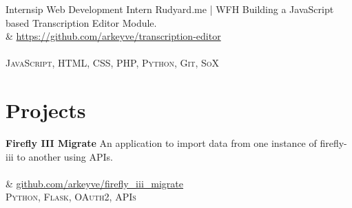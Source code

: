 \documentclass[10pt]{article} %
\begin{document}
\begin{paracol}{2}


{Internsip} %
{Web Development Intern} %
{Rudyard.me | WFH} %
{
Building a JavaScript based Transcription Editor Module.\\
\raisebox{-1pt}{\faGithub} & \href{https://github.com/arkeyve/transcription-editor}{https://github.com/arkeyve/transcription-editor} \\
\\
\textbf{\faCode} \textsc{JavaScript, HTML, CSS, PHP, Python, Git, SoX}
}  %


\vspace{-\baselineskip}\medskip %



\section{Projects}

{} %
{} %
{\textbf{Firefly III Migrate}} %
{
An application to import data from one instance of firefly-iii to another using APIs.\\
\\
\raisebox{-1pt}{\faGithub} & \href{https://github.com/arkeyve/firefly_iii_migrate}{github.com/arkeyve/firefly\_iii\_migrate}\\
\textbf{\faCode} \textsc{Python, Flask, OAuth2, APIs}
} %


\end{paracol}
\end{document}
